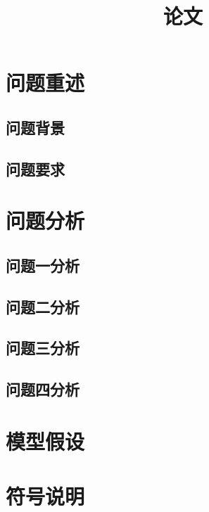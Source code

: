 \documentclass[withoutpreface,bwprint]{cumcmthesis} %
\title{论文}
\begin{document}
	
	\maketitle
	\begin{abstract}
		
		
	\end{abstract}
	
	
	
	\section{问题重述}
		\subsection{问题背景}
		
		\subsection{问题要求}
	
	\section{问题分析}
	
		\subsection{问题一分析}
		
		\subsection{问题二分析}
		
		\subsection{问题三分析}
		
		\subsection{问题四分析}
	
	\section{模型假设}
	
	
	\section{符号说明}
	
\end{document}
